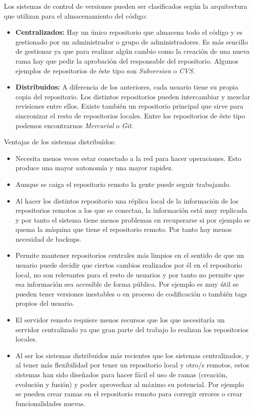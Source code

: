 \documentclass[12pt,a4paper,spanish]{book} %
\begin{document}
Los sistemas de control de versiones pueden ser clasificados según la arquitectura que utilizan para el almacenamiento del código:

\begin{itemize}
\item\textbf{Centralizados:} Hay un único repositorio que almacena todo el código y es gestionado por un administrador o grupo de administradores. Es más sencillo de gestionar ya que para realizar algún cambio como la creación de una nueva rama hay que pedir la aprobación del responsable del repositorio. Algunos ejemplos de repositorios de éste tipo son \emph{Subversion} o \emph{CVS}.
\item\textbf{Distribuidos:} A diferencia de los anteriores, cada usuario tiene su propia copia del repositorio. Los distintos repositorios pueden intercambiar y mezclar revisiones entre ellos. Existe también un repositorio principal que sirve para sincronizar el resto de repositorios locales. Entre los repositorios de éste tipo podemos encontrarnos \emph{Mercurial} o \emph{Git}.
\end{itemize}

Ventajas de los sistemas distribuídos:

\begin{itemize}
\item Necesita menos veces estar conectado a la red para hacer operaciones. Esto produce una mayor autonomía y una mayor rapidez.
\item Aunque se caiga el repositorio remoto la gente puede seguir trabajando.
\item Al hacer los distintos repositorio una réplica local de la información de los repositorios remotos a los que se conectan, la información está muy replicada y por tanto el sistema tiene menos problemas en recuperarse si por ejemplo se quema la máquina que tiene el repositorio remoto. Por tanto hay menos necesidad de backups.
\item Permite mantener repositorios centrales más limpios en el sentido de que un usuario puede decidir que ciertos cambios realizados por él en el repositorio local, no son relevantes para el resto de usuarios y por tanto no permite que esa información sea accesible de forma pública. Por ejemplo es muy útil se pueden tener versiones inestables o en proceso de codificación o también tags propios del usuario.
\item El servidor remoto requiere menos recursos que los que necesitaría un servidor centralizado ya que gran parte del trabajo lo realizan los repositorios locales.
\item Al ser los sistemas distribuidos más recientes que los sistemas centralizados, y al tener más flexibilidad por tener un repositorio local y otro/s remotos, estos sistemas han sido diseñados para hacer fácil el uso de ramas (creación, evolución y fusión) y poder aprovechar al máximo su potencial. Por ejemplo se pueden crear ramas en el repositorio remoto para corregir errores o crear funcionalidades nuevas. 
\end{itemize}
\end{document}
